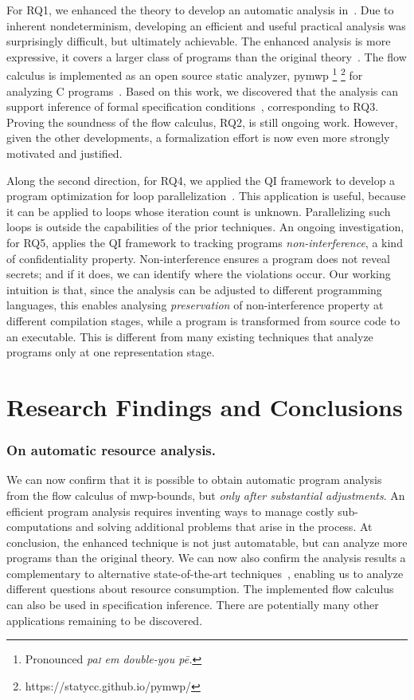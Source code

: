 For RQ1, we enhanced the theory to develop an automatic analysis in~\cite{aubert20222,aubert2023b,rusch2025}.
Due to inherent nondeterminism, developing an efficient and useful practical analysis was surprisingly difficult, but ultimately achievable.
The enhanced analysis is more expressive,
\ie it covers a larger class of programs than the original theory~\cite{rusch2025}.
The flow calculus is implemented as an open source static analyzer, pymwp%
\footnote{Pronounced \emph{pa\textsc{i} em double-you p\={e}.}}
\footnote{https://statycc.github.io/pymwp/}%
{ }for analyzing C programs~\cite{aubert2023b}.
Based on this work, we discovered that the analysis can support
inference of formal specification conditions~\cite{rusch2025}, corresponding to RQ3.
Proving the soundness of the flow calculus, RQ2, is still ongoing work.
However, given the other developments, a formalization effort is now even more strongly motivated and justified.

Along the second direction, for RQ4, we applied the QI framework to develop a program optimization for loop parallelization~\cite{aubert20232}.
This application is useful, because it can be applied to loops whose iteration count is unknown.
Parallelizing such loops is outside the capabilities of the prior techniques.
An ongoing investigation, for RQ5, applies the QI framework to tracking programs \emph{non\hyp{}interference}, a kind of confidentiality property.
Non-interference ensures a program does not reveal secrets;
and if it does, we can identify where the violations occur.
Our working intuition is that, since the analysis can be adjusted to different programming languages,
this enables analysing \emph{preservation} of non-interference property at different compilation stages,
while a program is transformed from source code to an executable.
This is different from many existing techniques that analyze programs only at one representation stage.

\section{Research Findings and Conclusions}
\label{aicc-discussion}

\subsubsection*{On automatic resource analysis.}
We can now confirm that it is possible to obtain automatic program analysis from the flow calculus of mwp-bounds, but \emph{only after substantial adjustments}.
An efficient program analysis requires inventing ways to manage costly sub-computations and solving additional problems that arise in the process.
At conclusion, the enhanced technique is not just automatable, but can analyze more programs than the original theory.
We can now also confirm the analysis results a complementary to alternative state-of-the-art techniques~\cite[p. 5]{aubert2023b}, enabling us to analyze different questions about resource consumption.
The implemented flow calculus can also be used in specification inference.
There are potentially many other applications remaining to be discovered.

